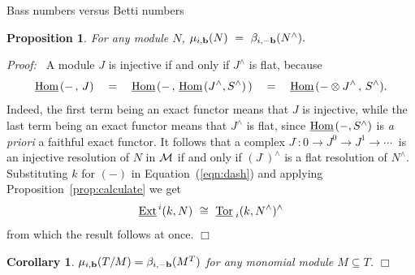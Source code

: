 \documentclass[12pt,leqno]{article}
\newtheorem{cor}[thm]{Corollary}
\newtheorem{prop}[thm]{Proposition}
\def\hhom{{{\underline{\rm Hom}}{\scriptscriptstyle \,}}}
\def\eext{{{\underline{\rm Ext}}{\scriptscriptstyle \,}}}
\def\ttor{{{\underline{\rm Tor}}{\scriptstyle \;}}}
\def\bb{{{\rm \bf b}}}
\begin{document}
\begin{section}{Bass numbers versus Betti numbers}
\begin{prop} \label{prop:complementation}
For any module $N$, 
$
	\mu_{i,\bb}(N)\ =\ \beta_{i,-\bb}(N^\wedge).
$
\end{prop}
{\it Proof:\ } A module $J$ is injective if and only if $J^\wedge$ is
flat, because 
\begin{equation} \label{eqn:dash}
  \hhom(-\,,\,J) \quad = \quad \hhom(-\,,\,\hhom(J^\wedge,S^\wedge)\,)
  \quad = \quad \hhom(- \otimes J^\wedge\,,\,S^\wedge).
\end{equation}
Indeed, the first term being an exact functor means that $J$ is
injective, while the last term being an exact functor means that
$J^\wedge$ is flat, since $\hhom(-,S^\wedge)$ is {\it a priori} a
faithful exact functor.  It follows that a complex $J^{\textstyle \cdot}
: 0 \to J^0 \to J^1 \to \cdots\ $ is an injective resolution of $N$ in
$\cal M$ if and only if $(J^{\textstyle \cdot})^\wedge$ is a flat
resolution of $N^\wedge$.  Substituting $k$ for $(-)$ in
Equation~(\ref{eqn:dash}) and applying Proposition~\ref{prop:calculate}
we get
\begin{equation} \label{eqn:ext.tor}
  \eext^i(k,N)\ \cong\ \ttor_i(k,N^\wedge)^\wedge
\end{equation}
from which the result follows at once.
%
\hfill
$\Box$
\begin{cor} \label{cor:lattice}
$\mu_{i,\bb}(T/M) = \beta_{i,-\bb}(M^T)$ for any monomial module $M
\subseteq T$.  \hfill $\Box$
\end{cor}


\end{section}
\end{document}
